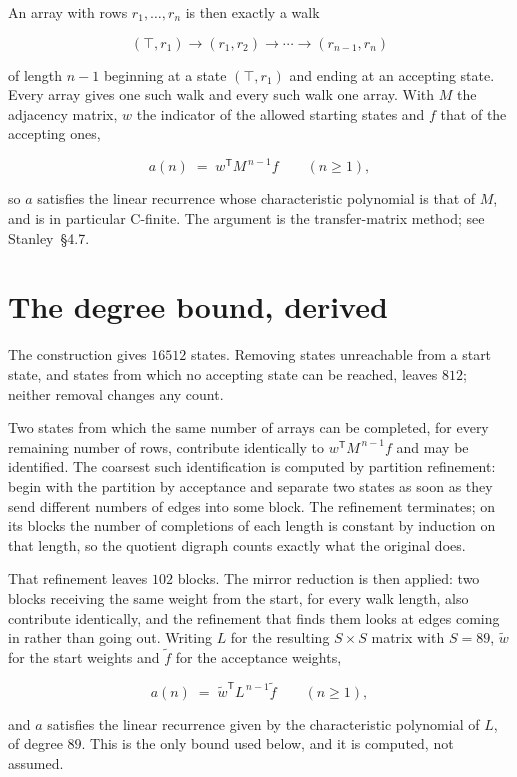 \documentclass[11pt]{article}
\theoremstyle{definition}
\begin{document}
An array with rows $r_1,\dots,r_n$ is then exactly a walk

\[(\top,r_1) \to (r_1,r_2) \to \cdots \to (r_{n-1},r_n)\]

of length $n-1$ beginning at a state $(\top,r_1)$ and ending at an accepting state. Every array gives one such walk and every such walk one array. With $M$ the adjacency matrix, $w$ the indicator of the allowed starting states and $f$ that of the accepting ones,

\[a(n) \;=\; w^{\mathsf T} M^{\,n-1} f \qquad (n \ge 1),\]

so $a$ satisfies the linear recurrence whose characteristic polynomial is that of $M$, and is in particular C-finite. The argument is the transfer-matrix method; see Stanley~\S4.7.

\section{The degree bound, derived}

The construction gives $16512$ states. Removing states unreachable from a start state, and states from which no accepting state can be reached, leaves $812$; neither removal changes any count.

Two states from which the same number of arrays can be completed, for every remaining number of rows, contribute identically to $w^{\mathsf T}M^{\,n-1}f$ and may be identified. The coarsest such identification is computed by partition refinement: begin with the partition by acceptance and separate two states as soon as they send different numbers of edges into some block. The refinement terminates; on its blocks the number of completions of each length is constant by induction on that length, so the quotient digraph counts exactly what the original does.

That refinement leaves $102$ blocks. The mirror reduction is then applied: two blocks receiving the same weight from the start, for every walk length, also contribute identically, and the refinement that finds them looks at edges coming in rather than going out. Writing $L$ for the resulting $S \times S$ matrix with $S = 89$, $\tilde w$ for the start weights and $\tilde f$ for the acceptance weights,

\[a(n) \;=\; \tilde w^{\mathsf T} L^{\,n-1} \tilde f \qquad (n \ge 1),\]

and $a$ satisfies the linear recurrence given by the characteristic polynomial of $L$, of degree $89$. This is the only bound used below, and it is computed, not assumed.
\end{document}
